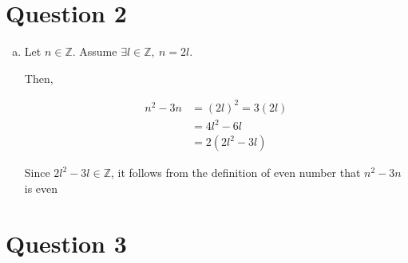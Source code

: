 \documentclass[12pt]{article}
\begin{document}
\section*{Question 2}
\begin{enumerate}[a.]
    \item

    Let $n \in \mathbb{Z}$. Assume $\exists l \in \mathbb{Z},\: n = 2l$.

    \bigbreak

    Then,

    \begin{align}
        n^2 - 3n &= (2l)^2 = 3(2l) \\
        &= 4l^2 - 6l \\
        &= 2(2l^2 - 3l)
    \end{align}

    \bigbreak

    Since $2l^2 - 3l \in \mathbb{Z}$, it follows from the definition of even number
    that $n^2-3n$ is even

\end{enumerate}

\section*{Question 3}
\end{document}
